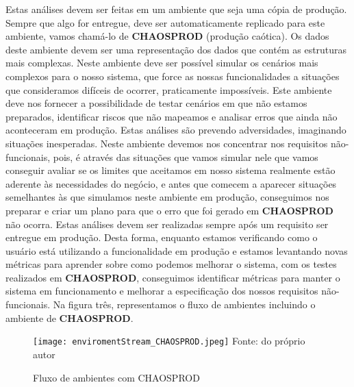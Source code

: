       Estas análises devem ser feitas em um ambiente que seja uma cópia de produção.
      Sempre que algo for entregue, deve ser automaticamente replicado para este
      ambiente, vamos chamá-lo de \textbf{CHAOSPROD} (produção caótica). Os dados
      deste ambiente devem ser uma representação dos dados que contém as estruturas
      mais complexas. Neste ambiente deve ser possível simular os cenários mais
      complexos para o nosso sistema, que force as nossas funcionalidades a situações
      que consideramos difíceis de ocorrer, praticamente impossíveis. Este ambiente
      deve nos fornecer a possibilidade de testar cenários em que não estamos preparados,
      identificar riscos que não mapeamos e analisar erros que ainda não aconteceram
      em produção. \newline
      Estas análises são prevendo adversidades, imaginando situações inesperadas.
      Neste ambiente devemos nos concentrar nos requisitos não-funcionais, pois,
      é através das situações que vamos simular nele que vamos conseguir avaliar
      se os limites que aceitamos em nosso sistema realmente estão aderente às
      necessidades do negócio, e antes que comecem a aparecer situações semelhantes
      às que simulamos neste ambiente em produção, conseguimos nos preparar e criar
      um plano para que o erro que foi gerado em \textbf{CHAOSPROD} não ocorra.
      Estas análises devem ser realizadas sempre após um requisito ser entregue
      em produção. Desta forma, enquanto estamos verificando como o usuário está
      utilizando a funcionalidade em produção e estamos levantando novas métricas
      para aprender sobre como podemos melhorar o sistema, com os testes realizados
      em \textbf{CHAOSPROD}, conseguimos identificar métricas para manter o
      sistema em funcionamento e melhorar a especificação dos nossos requisitos
      não-funcionais. Na figura três, representamos o fluxo de ambientes incluindo
      o ambiente de \textbf{CHAOSPROD}.

      \begin{figure}[h!]
        \label{Imagem:3}
        \caption{Fluxo de ambientes com CHAOSPROD}
        \texttt{[image: enviromentStream\_CHAOSPROD.jpeg]}
        \newline
        \small{Fonte: do próprio autor}
      \end{figure}

